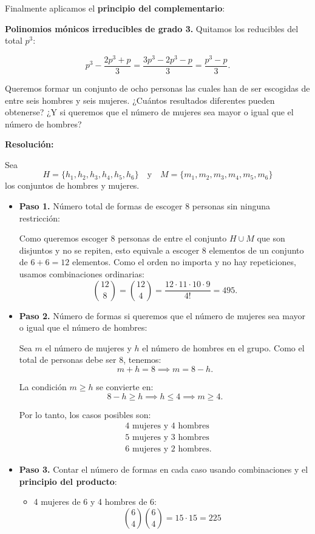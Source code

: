 \documentclass[a4paper,12pt]{article}
\begin{document}
\begin{ejercicio}[title=Ejercicio 28 (⋆)]

Finalmente aplicamos el \textbf{principio del complementario}:

\vspace{0.5em}

\textbf{Polinomios mónicos irreducibles de grado 3.}  
Quitamos los reducibles del total $p^3$:

\[
p^3 - \frac{2p^3 + p}{3}
= \frac{3p^3 - 2p^3 - p}{3}
= \boxed{\frac{p^3 - p}{3}}.
\]

\end{ejercicio}

\begin{ejercicio}[title=Ejercicio 30]
Queremos formar un conjunto de ocho personas las cuales han de ser escogidas de entre seis hombres y seis mujeres.  
¿Cuántos resultados diferentes pueden obtenerse? ¿Y si queremos que el número de mujeres sea mayor o igual que el número de hombres?

\tcblower
\textbf{Resolución:}

Sea 
\[
H = \{h_1,h_2,h_3,h_4,h_5,h_6\} \quad \text{y} \quad 
M = \{m_1,m_2,m_3,m_4,m_5,m_6\}
\]
los conjuntos de hombres y mujeres.

\begin{itemize}
\item[] \textbf{Paso 1.} Número total de formas de escoger 8 personas sin ninguna restricción:

Como queremos escoger 8 personas de entre el conjunto $H \cup M$ que son disjuntos y no se repiten, esto equivale a escoger 8 elementos de un conjunto de $6+6=12$ elementos.  
Como el orden no importa y no hay repeticiones, usamos combinaciones ordinarias:
\[
\binom{12}{8} = \binom{12}{4} = \frac{12 \cdot 11 \cdot 10 \cdot 9}{4!} = \boxed{495}.
\]

\item[] \textbf{Paso 2.} Número de formas si queremos que el número de mujeres sea mayor o igual que el número de hombres:

Sea $m$ el número de mujeres y $h$ el número de hombres en el grupo.  
Como el total de personas debe ser 8, tenemos:
\[
m+h=8 \implies m = 8 - h.
\]

La condición $m \ge h$ se convierte en:
\[
8 - h \ge h \implies h \le 4 \implies m \ge 4.
\]

Por lo tanto, los casos posibles son:
\[
\begin{aligned}
&\text{4 mujeres y 4 hombres} \\
&\text{5 mujeres y 3 hombres} \\
&\text{6 mujeres y 2 hombres}.
\end{aligned}
\]

\item[] \textbf{Paso 3.} Contar el número de formas en cada caso usando combinaciones y el \textbf{principio del producto}:

\begin{itemize}
 \item 4 mujeres de 6 y 4 hombres de 6:
 \[
 \binom{6}{4}\binom{6}{4} = 15 \cdot 15 = 225
 \]
 \end{itemize}
 \end{itemize}
 \end{ejercicio}
\end{document}
